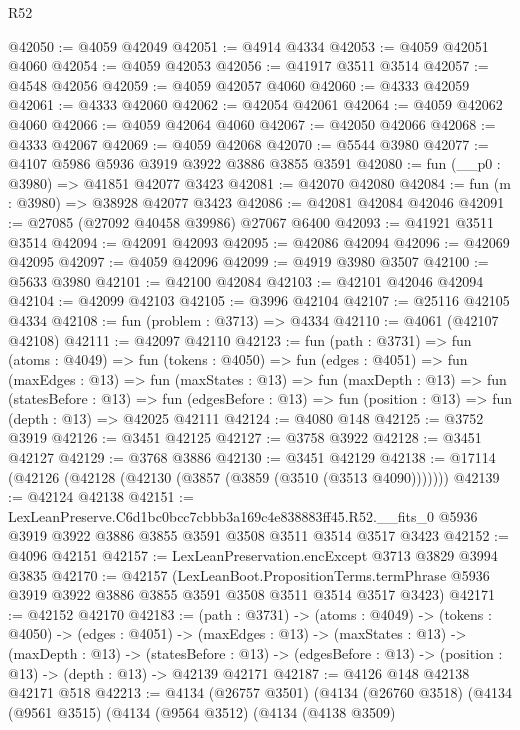 \begin{lexlean}{R52}
\begin{coremodule}
@42050 := @4059 @42049
@42051 := @4914 @4334
@42053 := @4059 @42051 @4060
@42054 := @4059 @42053
@42056 := @41917 @3511 @3514
@42057 := @4548 @42056
@42059 := @4059 @42057 @4060
@42060 := @4333 @42059
@42061 := @4333 @42060
@42062 := @42054 @42061
@42064 := @4059 @42062 @4060
@42066 := @4059 @42064 @4060
@42067 := @42050 @42066
@42068 := @4333 @42067
@42069 := @4059 @42068
@42070 := @5544 @3980
@42077 := @4107 @5986 @5936 @3919 @3922 @3886 @3855 @3591
@42080 := fun (__p0 : @3980) => @41851 @42077 @3423
@42081 := @42070 @42080
@42084 := fun (m : @3980) => @38928 @42077 @3423
@42086 := @42081 @42084 @42046
@42091 := @27085 (@27092 @40458 @39986) @27067 @6400
@42093 := @41921 @3511 @3514
@42094 := @42091 @42093
@42095 := @42086 @42094
@42096 := @42069 @42095
@42097 := @4059 @42096
@42099 := @4919 @3980 @3507
@42100 := @5633 @3980
@42101 := @42100 @42084
@42103 := @42101 @42046 @42094
@42104 := @42099 @42103
@42105 := @3996 @42104
@42107 := @25116 @42105 @4334
@42108 := fun (problem : @3713) => @4334
@42110 := @4061 (@42107 @42108)
@42111 := @42097 @42110
@42123 := fun (path : @3731) =>
  fun (atoms : @4049) =>
  fun (tokens : @4050) =>
  fun (edges : @4051) =>
  fun (maxEdges : @13) =>
  fun (maxStates : @13) =>
  fun (maxDepth : @13) =>
  fun (statesBefore : @13) =>
  fun (edgesBefore : @13) => fun (position : @13) => fun (depth : @13) => @42025 @42111
@42124 := @4080 @148
@42125 := @3752 @3919
@42126 := @3451 @42125
@42127 := @3758 @3922
@42128 := @3451 @42127
@42129 := @3768 @3886
@42130 := @3451 @42129
@42138 := @17114 (@42126 (@42128 (@42130 (@3857 (@3859 (@3510 (@3513 @4090)))))))
@42139 := @42124 @42138
@42151 := LexLeanPreserve.C6d1bc0bcc7cbbb3a169c4e838883ff45.R52.__fits_0
    @5936
    @3919
    @3922
    @3886
    @3855
    @3591
    @3508
    @3511
    @3514
    @3517
    @3423
@42152 := @4096 @42151
@42157 := LexLeanPreservation.encExcept @3713 @3829 @3994 @3835
@42170 := @42157
    (LexLeanBoot.PropositionTerms.termPhrase
      @5936
      @3919
      @3922
      @3886
      @3855
      @3591
      @3508
      @3511
      @3514
      @3517
      @3423)
@42171 := @42152 @42170
@42183 := (path : @3731) ->
  (atoms : @4049) ->
  (tokens : @4050) ->
  (edges : @4051) ->
  (maxEdges : @13) ->
  (maxStates : @13) ->
  (maxDepth : @13) ->
  (statesBefore : @13) -> (edgesBefore : @13) -> (position : @13) -> (depth : @13) -> @42139 @42171
@42187 := @4126 @148 @42138 @42171 @518
@42213 := @4134
    (@26757 @3501)
    (@4134
      (@26760 @3518)
      (@4134
        (@9561 @3515)
        (@4134
          (@9564 @3512)
          (@4134
            (@4138 @3509)

\end{coremodule}
\end{lexlean}
